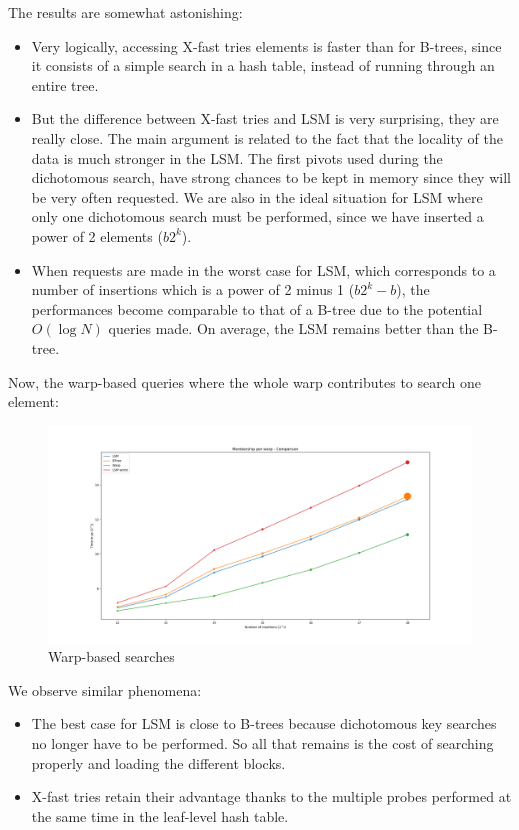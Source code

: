 The results are somewhat astonishing:
\begin{itemize}
    \item Very logically, accessing X-fast tries elements is faster than for B-trees, since it consists of a simple search in a hash table, instead of running through an entire tree.
    \item But the difference between X-fast tries and LSM is very surprising, they are really close. The main argument is related to the fact that the locality of the data is much stronger in the LSM. The first pivots used during the dichotomous search, have strong chances to be kept in memory since they will be very often requested. We are also in the ideal situation for LSM where only one dichotomous search must be performed, since we have inserted a power of 2 elements ($b2^{k}$).
    \item When requests are made in the worst case for LSM, which corresponds to a number of insertions which is a power of 2 minus 1 ($b2^{k} - b$), the performances become comparable to that of a B-tree due to the potential $O(\log N)$ queries made. On average, the LSM remains better than the B-tree.
\end{itemize}

Now, the warp-based queries where the whole warp contributes to search one element:

\begin{figure}[!htb]
    \centering
    \includegraphics[width=0.85\linewidth]{Chapters/ParallelXFastTries/Membership_warp.png} 
    \caption{Warp-based searches}
\end{figure}

We observe similar phenomena:
\begin{itemize}
    \item The best case for LSM is close to B-trees because dichotomous key searches no longer have to be performed. So all that remains is the cost of searching properly and loading the different blocks.
    \item X-fast tries retain their advantage thanks to the multiple probes performed at the same time in the leaf-level hash table.
\end{itemize}

